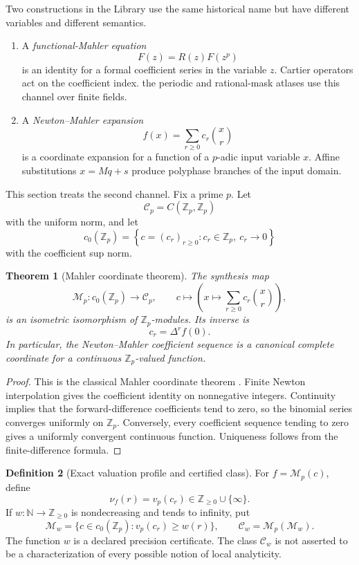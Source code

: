 \documentclass[11pt]{article}
\newtheorem{theorem}{Theorem}[section]
\theoremstyle{definition}
\newtheorem{definition}[theorem]{Definition}
\theoremstyle{remark}
\begin{document}
Two constructions in the Library use the same historical name but have different variables and different semantics.

\begin{enumerate}
\item A \emph{functional-Mahler equation}
\[
 F(z)=R(z)F(z^p)
\]
is an identity for a formal coefficient series in the variable \(z\).  Cartier operators act on the coefficient index.  the periodic and rational-mask atlases use this channel over finite fields.
\item A \emph{Newton--Mahler expansion}
\[
 f(x)=\sum_{r\geq0}c_r\binom xr
\]
is a coordinate expansion for a function of a \(p\)-adic input variable \(x\).  Affine substitutions \(x=Mq+s\) produce polyphase branches of the input domain.
\end{enumerate}

This section treats the second channel.  Fix a prime \(p\).  Let
\[
 \mathcal C_p=C(\mathbb Z_p,\mathbb Z_p)
\]
with the uniform norm, and let
\[
 c_0(\mathbb Z_p)
 =
 \left\{c=(c_r)_{r\geq0}:c_r\in\mathbb Z_p,\ c_r\longrightarrow0\right\}
\]
with the coefficient sup norm.

\begin{theorem}[Mahler coordinate theorem]
\label{thm:block08-mahler-coordinate}
The synthesis map
\[
 \mathcal M_p:c_0(\mathbb Z_p)\longrightarrow\mathcal C_p,
 \qquad
 c\longmapsto
 \left(x\longmapsto\sum_{r\geq0}c_r\binom xr\right),
\]
is an isometric isomorphism of \(\mathbb Z_p\)-modules.  Its inverse is
\[
 \boxed{c_r=\Delta^r f(0).}
\]
In particular, the Newton--Mahler coefficient sequence is a canonical complete coordinate for a continuous \(\mathbb Z_p\)-valued function.
\end{theorem}

\begin{proof}
This is the classical Mahler coordinate theorem \cite{Mahler1958}.  Finite Newton interpolation gives the coefficient identity on nonnegative integers.  Continuity implies that the forward-difference coefficients tend to zero, so the binomial series converges uniformly on \(\mathbb Z_p\).  Conversely, every coefficient sequence tending to zero gives a uniformly convergent continuous function.  Uniqueness follows from the finite-difference formula.
\end{proof}

\begin{definition}[Exact valuation profile and certified class]
\label{def:block08-weight-class}
For \(f=\mathcal M_p(c)\), define
\[
 \nu_f(r)=v_p(c_r)\in\mathbb Z_{\geq0}\cup\{\infty\}.
\]
If \(w:\mathbb N\to\mathbb Z_{\geq0}\) is nondecreasing and tends to infinity, put
\[
 \mathcal M_w
 =
 \{c\in c_0(\mathbb Z_p):v_p(c_r)\geq w(r)\},
 \qquad
 \mathcal C_w=\mathcal M_p(\mathcal M_w).
\]
The function \(w\) is a declared precision certificate.  The class \(\mathcal C_w\) is not asserted to be a characterization of every possible notion of local analyticity.
\end{definition}
\end{document}
